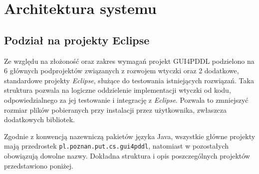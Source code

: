 \chapter{Architektura systemu}
\section{Podział na projekty Eclipse}


Ze względu na złożoność oraz zakres wymagań projekt GUI4PDDL podzielono na 6 głównych podprojektów związanych z rozwojem wtyczki oraz 2 dodatkowe, standardowe projekty \emph{Eclipse}, służące do testowania istniejących rozwiązań. Taka struktura pozwala na logiczne oddzielenie implementacji wtyczki od kodu, odpowiedzialnego za jej testowanie i integrację z \emph{Eclipse}. Pozwala to zmniejszyć rozmiar plików pobieranych przy instalacji przez użytkownika, zwłaszcza dodatkowych bibliotek.

Zgodnie z konwencją nazewniczą pakietów języka Java, wszystkie główne projekty mają przedrostek \texttt{pl.poznan.put.cs.gui4pddl}, natomiast w pozostałych obowiązują dowolne nazwy. Dokładna struktura i opis poszczególnych projektów przedstawiono poniżej.

